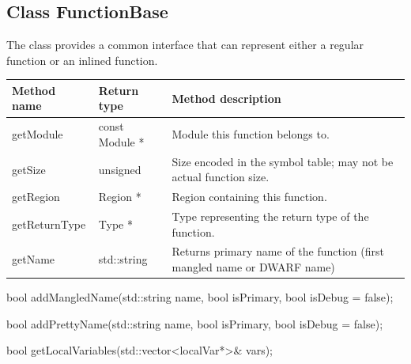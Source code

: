\subsection{Class FunctionBase}
\label{FunctionBase}


The  class provides a common interface that can represent either a regular function or an inlined function.

\begin{tabularx}{\textwidth}{llX}
\toprule
Method name & Return type & Method description \\
\midrule
getModule & const Module * & Module this function belongs to. \\
getSize & unsigned & Size encoded in the symbol table; may not be actual function size. \\
getRegion & Region * & Region containing this function. \\
getReturnType & Type * & Type representing the return type of the function. \\
getName & std::string & Returns primary name of the function (first mangled name or DWARF name) \\
\bottomrule
\end{tabularx}


\begin{apient}
bool addMangledName(std::string name,
                    bool isPrimary,
                    bool isDebug = false);
\end{apient}

\begin{apient}
bool addPrettyName(std::string name,
                   bool isPrimary,
                   bool isDebug = false);
\end{apient}

\begin{apient}
bool getLocalVariables(std::vector<localVar*>& vars);
\end{apient}

